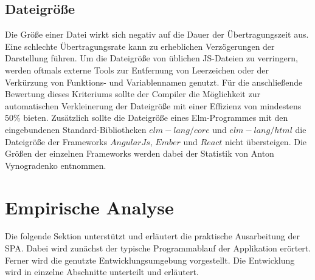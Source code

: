\subsection{Dateigröße}
\label{sec:muster_dateigroesse}
Die Größe einer Datei wirkt sich negativ auf die Dauer der Übertragungszeit aus. Eine schlechte Übertragungsrate kann zu erheblichen Verzögerungen der Darstellung führen. Um die Dateigröße von üblichen \ac{JS}-Dateien zu verringern, werden oftmals externe Tools zur Entfernung von Leerzeichen oder der Verkürzung von Funktions- und Variablennamen genutzt. Für die anschließende Bewertung dieses Kriteriums sollte der Compiler die Möglichkeit zur automatischen Verkleinerung der Dateigröße mit einer Effizienz von mindestens 50\% bieten. Zusätzlich sollte die Dateigröße eines Elm-Programmes mit den eingebundenen Standard-Bibliotheken $elm-lang/core$ und $elm-lang/html$ die Dateigröße der Frameworks $AngularJs$, $Ember$ und $React$ nicht übersteigen. Die Größen der einzelnen Frameworks werden dabei der Statistik von Anton Vynogradenko \cite[Vgl.]{framework-sizes} entnommen.

\newpage
\section{Empirische Analyse}
\label{sec:Empirische Analyse}
Die folgende Sektion unterstützt und erläutert die praktische Ausarbeitung der \ac{SPA}. Dabei wird zunächst der typische Programmablauf der Applikation erörtert. Ferner wird die genutzte Entwicklungsumgebung vorgestellt. Die Entwicklung wird in einzelne Abschnitte unterteilt und erläutert.

